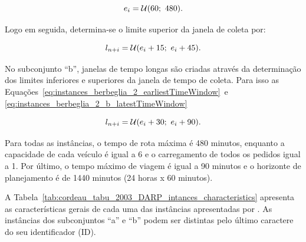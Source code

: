 \begin{equation}
  e_i = \mathcal{U}(60;\ 480).
  \label{eq:instances_berbeglia_2_earliestTimeWindow}
\end{equation}

Logo em seguida, determina-se o limite superior da janela de coleta por:

\begin{equation}
  l_{n + i}  = \mathcal{U}(e_i + 15;\ e_i + 45).
  \label{eq:instances_berbeglia_2_a_latestTimeWindow}
\end{equation}

No subconjunto ``b'', janelas de tempo longas são criadas através da
determinação dos limites inferiores e superiores da janela de tempo de coleta.
Para isso as Equações~\ref{eq:instances_berbeglia_2_earliestTimeWindow}~e
\ref{eq:instances_berbeglia_2_b_latestTimeWindow}

\begin{equation}
  l_{n + i} = 
  \mathcal{U}(e_i + 30;\ e_i + 90).
  \label{eq:instances_berbeglia_2_b_latestTimeWindow}
\end{equation}

Para todas as instâncias, o tempo de rota máxima é 480 minutos, enquanto a
capacidade de cada veículo é igual a 6 e o carregamento de todos os pedidos
igual a 1.
Por último, o tempo máximo de viagem é igual a 90 minutos e o horizonte de
planejamento é de 1440 minutos (24 horas x 60 minutos).

A Tabela~\ref{tab:cordeau_tabu_2003_DARP_intances_characteristics} apresenta as
características gerais de cada uma das instâncias apresentadas por
\textcite{cordeau_tabu_2003}.
As instâncias dos subconjuntos ``a'' e ``b'' podem ser distintas pelo último
caractere do seu identificador (ID).


